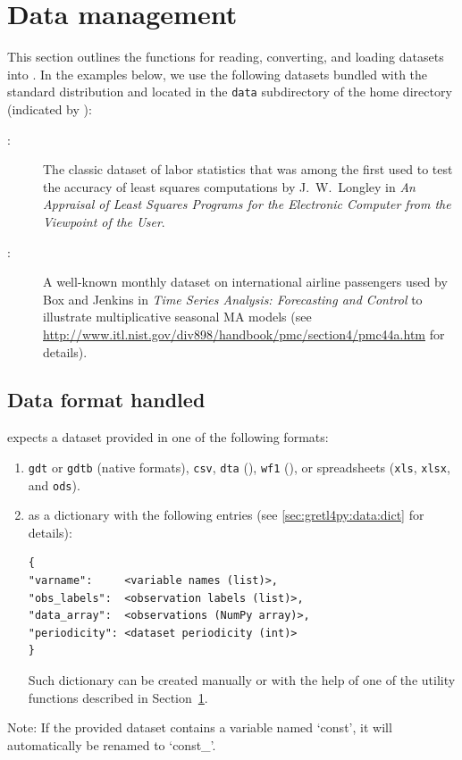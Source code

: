 \section{Data management}\label{sec:data_management_python}
This section outlines the functions for reading, converting,
and loading datasets into \gretlpy.
In the examples below, we use the following datasets bundled
with the standard \gretlpy distribution and located in the
\texttt{data} subdirectory of the \gretl home directory
(indicated by ):
\begin{description}
	\item[:] The classic dataset of labor
		statistics that was among the first used to test the
		accuracy of least squares computations by J.~W.~Longley
		in \textit{An Appraisal of Least Squares Programs for the
		Electronic Computer from the Viewpoint of the User}.
	\item[:] A well-known monthly dataset on
		international airline passengers used by Box and Jenkins
		in \textit{Time Series Analysis: Forecasting and Control}
		to illustrate multiplicative seasonal MA models
		(see \url{http://www.itl.nist.gov/div898/handbook/pmc/section4/pmc44a.htm}
		for details).
\end{description}


\subsection{Data format handled}\label{sec:data_format_handled}
\gretlpy expects a dataset provided in one of the following formats:
\begin{enumerate}
	\item \texttt{gdt} or \texttt{gdtb} (\lgretl['s] native formats),
		\texttt{csv}, \texttt{dta} (), \texttt{wf1} (),
		or spreadsheets (\texttt{xls}, \texttt{xlsx}, and \texttt{ods}).
	\item as a \python['s] dictionary with the following entries
	(see \ref{sec:gretl4py:data:dict} for details):
	\begin{lstlisting}[style=pythonstylefoot]
{
"varname":     <variable names (list)>,
"obs_labels":  <observation labels (list)>,
"data_array":  <observations (NumPy array)>,
"periodicity": <dataset periodicity (int)>
}
	\end{lstlisting}
	Such dictionary can be created manually or with the help
	of one of the utility functions described in
	Section~\ref{sec:data_management_python}.
\end{enumerate}
Note: If the provided dataset contains a variable named
`const', it will automatically be renamed to `const\_'.


